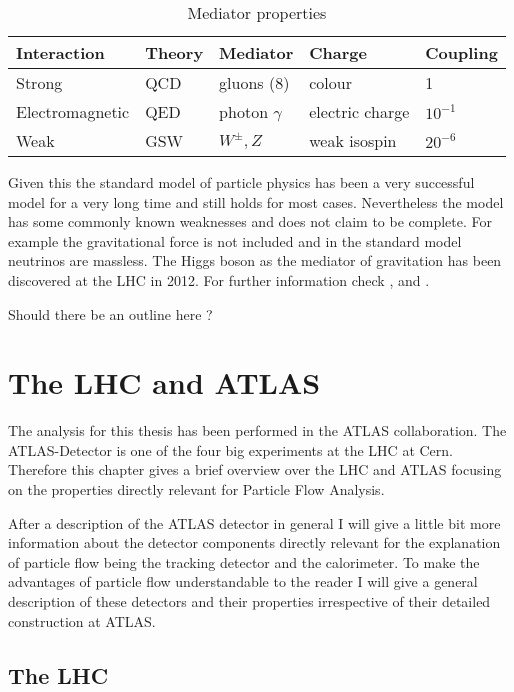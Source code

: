 \begin{table}[h]
\centering
\caption{Mediator properties}
\label{mediator properties}
\begin{tabular}{|l|l|l|l|l|}
\hline
Interaction     & Theory & Mediator        & Charge          & Coupling  \\ \hline
Strong          & QCD    & gluons (8)      & colour          & 1         \\ \hline
Electromagnetic & QED    & photon $\gamma$ & electric charge & $10^{-1}$ \\ \hline
Weak            & GSW    & $W^{\pm}, Z$    & weak isospin    & $20^{-6}$ \\ \hline
\end{tabular}
\end{table}

Given this the standard model of particle physics has been a very successful model for a very long time and still holds for most cases.
Nevertheless the model has some commonly known weaknesses and does not claim to be complete. For example the gravitational force is not included and in the standard model neutrinos are massless.
The Higgs boson as the mediator of gravitation has been discovered at the LHC in 2012. 
For further information check \cite{griffith08}, \cite{thomson13} and \cite{brock11}.

Should there be an outline here ? 
\newpage





\section{The LHC and ATLAS}

The analysis for this thesis has been performed in the ATLAS collaboration. The ATLAS-Detector is one of the four big experiments at the LHC at Cern. Therefore this chapter gives a brief overview over the LHC and ATLAS focusing on the properties directly relevant for Particle Flow Analysis.

After a description of the ATLAS detector in general I will give a little bit more information about the detector components directly relevant for the explanation of particle flow being the tracking detector and the calorimeter. To make the advantages of particle flow understandable to the reader I will give a general description of these detectors and their properties irrespective of their detailed construction at ATLAS.

\subsection{The LHC}

